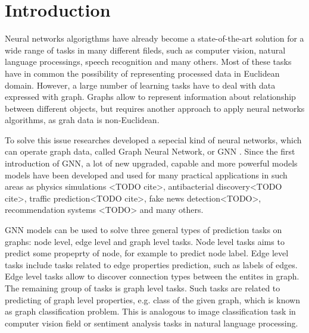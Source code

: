 \section{Introduction}


Neural networks algorigthms have already become a state-of-the-art solution for a wide range of tasks
in many different fileds, such as computer vision, natural language processings, speech recognition and many others.
Most of these tasks have in common the possibility of representing processed data in Euclidean domain. However,
a large number of learning tasks have to deal with data expressed with graph. Graphs allow 
to represent information about relationship between different objects, but requires another approach 
to apply neural networks algorithms, as grah data is non-Euclidean. 

To solve this issue researches developed a sepecial kind of neural networks, which can operate graph data, called 
Graph Neural Network, or GNN \cite{GNN}. Since the first introduction of GNN, a lot of new upgraded, capable and more powerful 
models models have been developed and used for many practical applications in such areas as
physics simulations <TODO cite>,  antibacterial discovery<TODO cite>,  traffic prediction<TODO cite>, fake news detection<TODO>, 
recommendation systems <TODO> and many others. 





GNN models can be used to solve three general types of prediction tasks on graphs: 
node level, edge level and graph level tasks. Node level tasks aims to predict some propeprty of node, for example
to predict node label. Edge level tasks include tasks related to edge properties prediction, such as labels of edges. 
Edge level tasks allow to discover connection types between the entites in graph. The remaining group of tasks is graph level tasks.
Such tasks are related to predicting of graph level properties, e.g. class of the given graph, which is known as
graph classification problem. This is analogous to image classification task in computer vision field or
sentiment analysis tasks in natural language processing.


